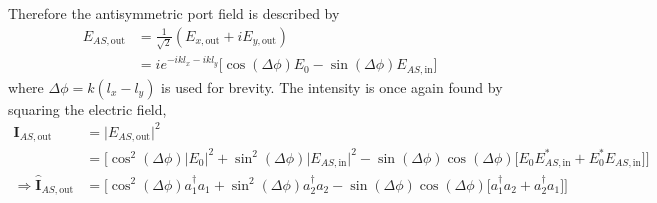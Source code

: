 		Therefore the antisymmetric port field is described by
		\begin{equation}
		\begin{aligned}
		E_{AS,\text{out}} 	&= \frac{1}{\sqrt{2}} (E_{x,\text{out}} + iE_{y,\text{out}})\\
					&= i e^{-ikl_x-ikl_y} \big[\cos(\Delta \phi) E_0 - \sin(\Delta \phi) E_{AS,\text{in}}\big]
		\end{aligned}
		\end{equation}
		where $\Delta \phi = k(l_x-l_y)$ is used for brevity.  The intensity is once again found by squaring the electric field,
		\begin{equation}
		\begin{aligned}
		\mathbf{I}_{AS,\text{out}} 		&= \vert E_{AS,\text{out}}\vert^2 \\
									&= \bigg[ \cos^2(\Delta \phi)\vert E_0\vert^2 + \sin^2(\Delta\phi)\vert E_{AS,\text{in}}\vert^2 - \sin(\Delta\phi)\cos(\Delta\phi) \big[E_0 E^*_{AS,\text{in}} + E_0^* E_{AS,\text{in}}\big] \bigg]\\
		\Rightarrow	
		\hat{\mathbf{I}}_{AS,\text{out}} 	&= \bigg[ \cos^2(\Delta \phi)a_1^{\dagger}a_1 + \sin^2(\Delta\phi)a_2^{\dagger}a_2 - \sin(\Delta\phi)\cos(\Delta \phi) \big[a_1^{\dagger}a_2 + a_2^{\dagger}a_1 \big] \bigg]\\	
		\end{aligned}
		\end{equation}
		
